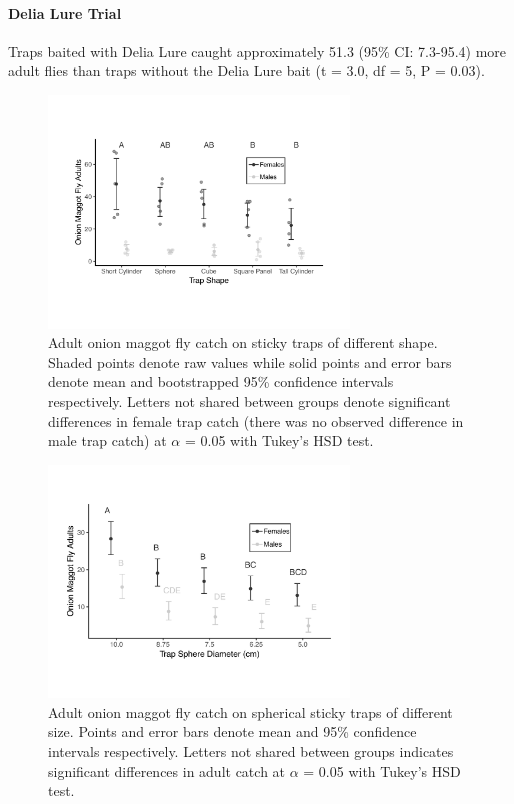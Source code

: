 \documentclass[alpha-refs]{wiley-article}
\begin{document}
\paragraph{Delia Lure Trial} Traps baited with Delia Lure caught approximately 51.3 (95\% CI: 7.3-95.4) more adult flies than traps without the Delia Lure bait (t = 3.0, df = 5, P = 0.03).




\begin{figure}[bt]
\centering
\includegraphics[width = 8cm]{figures/publication/figure-1.pdf}
\caption{Adult onion maggot fly catch on sticky traps of different shape.  Shaded points denote raw values while solid points and error bars denote mean and bootstrapped 95\% confidence intervals respectively.  Letters not shared between groups denote significant differences in female trap catch (there was no observed difference in male trap catch) at $\alpha$ = 0.05 with Tukey's HSD test. }
\label{fig:figure1}
\end{figure}

\begin{figure}[bt]
\centering
\includegraphics[width = 8cm]{figures/publication/figure-2.pdf}
\caption{Adult onion maggot fly catch on spherical sticky traps of different size.  Points and error bars denote mean and 95\% confidence intervals respectively.  Letters not shared between groups indicates significant differences in adult catch at $\alpha$ = 0.05 with Tukey's HSD test.}
\label{fig:figure2}
\end{figure}
\end{document}

